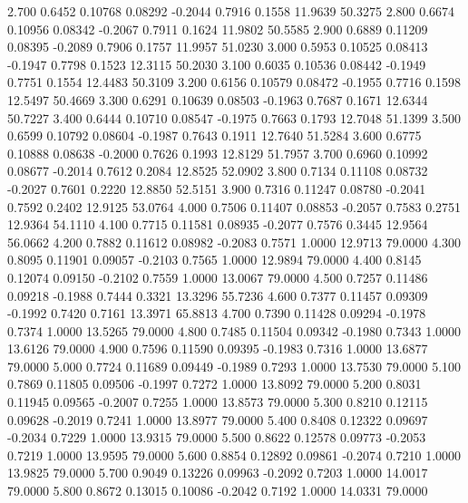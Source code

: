    2.700   0.6452   0.10768   0.08292  -0.2044   0.7916   0.1558  11.9639  50.3275
   2.800   0.6674   0.10956   0.08342  -0.2067   0.7911   0.1624  11.9802  50.5585
   2.900   0.6889   0.11209   0.08395  -0.2089   0.7906   0.1757  11.9957  51.0230
   3.000   0.5953   0.10525   0.08413  -0.1947   0.7798   0.1523  12.3115  50.2030
   3.100   0.6035   0.10536   0.08442  -0.1949   0.7751   0.1554  12.4483  50.3109
   3.200   0.6156   0.10579   0.08472  -0.1955   0.7716   0.1598  12.5497  50.4669
   3.300   0.6291   0.10639   0.08503  -0.1963   0.7687   0.1671  12.6344  50.7227
   3.400   0.6444   0.10710   0.08547  -0.1975   0.7663   0.1793  12.7048  51.1399
   3.500   0.6599   0.10792   0.08604  -0.1987   0.7643   0.1911  12.7640  51.5284
   3.600   0.6775   0.10888   0.08638  -0.2000   0.7626   0.1993  12.8129  51.7957
   3.700   0.6960   0.10992   0.08677  -0.2014   0.7612   0.2084  12.8525  52.0902
   3.800   0.7134   0.11108   0.08732  -0.2027   0.7601   0.2220  12.8850  52.5151
   3.900   0.7316   0.11247   0.08780  -0.2041   0.7592   0.2402  12.9125  53.0764
   4.000   0.7506   0.11407   0.08853  -0.2057   0.7583   0.2751  12.9364  54.1110
   4.100   0.7715   0.11581   0.08935  -0.2077   0.7576   0.3445  12.9564  56.0662
   4.200   0.7882   0.11612   0.08982  -0.2083   0.7571   1.0000  12.9713  79.0000
   4.300   0.8095   0.11901   0.09057  -0.2103   0.7565   1.0000  12.9894  79.0000
   4.400   0.8145   0.12074   0.09150  -0.2102   0.7559   1.0000  13.0067  79.0000
   4.500   0.7257   0.11486   0.09218  -0.1988   0.7444   0.3321  13.3296  55.7236
   4.600   0.7377   0.11457   0.09309  -0.1992   0.7420   0.7161  13.3971  65.8813
   4.700   0.7390   0.11428   0.09294  -0.1978   0.7374   1.0000  13.5265  79.0000
   4.800   0.7485   0.11504   0.09342  -0.1980   0.7343   1.0000  13.6126  79.0000
   4.900   0.7596   0.11590   0.09395  -0.1983   0.7316   1.0000  13.6877  79.0000
   5.000   0.7724   0.11689   0.09449  -0.1989   0.7293   1.0000  13.7530  79.0000
   5.100   0.7869   0.11805   0.09506  -0.1997   0.7272   1.0000  13.8092  79.0000
   5.200   0.8031   0.11945   0.09565  -0.2007   0.7255   1.0000  13.8573  79.0000
   5.300   0.8210   0.12115   0.09628  -0.2019   0.7241   1.0000  13.8977  79.0000
   5.400   0.8408   0.12322   0.09697  -0.2034   0.7229   1.0000  13.9315  79.0000
   5.500   0.8622   0.12578   0.09773  -0.2053   0.7219   1.0000  13.9595  79.0000
   5.600   0.8854   0.12892   0.09861  -0.2074   0.7210   1.0000  13.9825  79.0000
   5.700   0.9049   0.13226   0.09963  -0.2092   0.7203   1.0000  14.0017  79.0000
   5.800   0.8672   0.13015   0.10086  -0.2042   0.7192   1.0000  14.0331  79.0000
